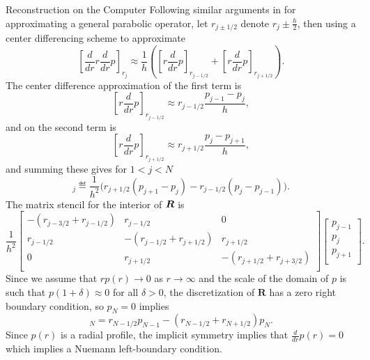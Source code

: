 \begin{chapter}{Reconstruction on the Computer}
Following similar arguments in \citep{morton2005numerical} for approximating a general parabolic operator, let $r_{j\pm 1/2}$ denote $r_j \pm \frac h2$, then using a center differencing scheme to approximate 
\begin{equation}
  \left[\frac d{dr} r\frac d{dr} p\right]_{r_j} \approx\frac 1h\left( \left[r\frac d{dr}p\right]_{r_{j-1/2}} +  \left[r\frac d{dr}p\right]_{r_{j+1/2}}\right). 
\end{equation}
The center difference approximation of the first term is
\begin{equation}
  \left[r\frac d {dr}p\right]_{r_{j-1/2}} \approx r_{j-1/2} \frac{p_{j-1} - p_{j}}{h},
\end{equation}
and on the second term is
\begin{equation}
  \left[r\frac d {dr}p\right]_{r_{j+1/2}} \approx r_{j+1/2} \frac{p_{j} - p_{j+1}}{h},
\end{equation}
and summing these gives for $1<j<N$
\begin{equation}
  [\bm R \bm p]_j \eqdef \frac{1}{h^2} \Big( r_{j+1/2}(p_{j+1} - p_j) - r_{j-1/2}(p_{j} - p_{j-1})\Big).
  \label{laplacian_discretization}
\end{equation}
The matrix stencil for the interior of $\mbox{\boldmath$R$}$ is
\begin{equation}
  \frac{1}{h^2}
  \left[\begin{array}{ccc}
    -(r_{j-3/2} + r_{j-1/2}) & r_{j-1/2} & 0             \\
    r_{j-1/2} & -(r_{j-1/2} + r_{j+1/2}) & r_{j+1/2}     \\
    0 & r_{j+1/2} & -(r_{j+1/2} + r_{j+3/2}) \\
  \end{array}\right]
  \left[\begin{array}{c}
    p_{j-1} \\
    p_{j}   \\
    p_{j+1} \\
  \end{array}\right].
  \label{laplacian_discretization_stencil}
\end{equation}
Since we assume that $rp(r) \to 0$ as $r\to \infty$ and the scale of the domain of $p$ is such that $p(1+\delta)\approx 0$ for all $\delta >0$, the discretization of $\bm R$ has a zero right boundary condition, so $p_{N}= 0$ implies
\begin{equation}
  [\vect R\vect p]_N = r_{N-1/2}p_{N-1} - (r_{N-1/2}+r_{N+1/2})p_N.
\end{equation}
Since $p(r)$ is a radial profile, the implicit symmetry implies that $\frac d{dr}p(r) = 0$ which implies a Nuemann left-boundary condition. 

\end{chapter}
